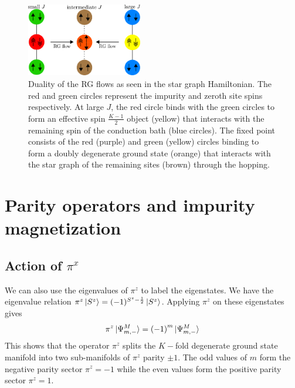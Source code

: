 \documentclass[12pt]{revtex4-2}
\begin{document}
\begin{figure}[htpb]
	\centering
	\includegraphics[width=0.45\textwidth]{./duality.pdf}
	\caption{Duality of the RG flows as seen in the star graph Hamiltonian. The red and green circles represent the impurity and zeroth site spins respectively. At large \(J\), the red circle binds with the green circles to form an effective spin \(\frac{K-1}{2}\) object (yellow) that interacts with the remaining spin of the conduction bath (blue circles). The fixed point consists of the red (purple) and green (yellow) circles binding to form a doubly degenerate ground state (orange) that interacts with the star graph of the remaining sites (brown) through the hopping.}
	\label{duality_fig}
\end{figure}

\section{Parity operators and impurity magnetization}

\subsection{Action of \(\pi^x\)}
We can also use the eigenvalues of \(\pi^z\) to label the eigenstates. We have the eigenvalue relation \(\pi^z \ket{S^z} = (-1)^{S^z - \frac{1}{2}}\ket{S^z}\). Applying \(\pi^z\) on these eigenstates gives
\begin{align}
	\pi^z\ket{\Psi^M_{m,-}} = \left( -1 \right) ^{m}\ket{\Psi^M_{m,-}}
\end{align}
This shows that the operator \(\pi^z\) splits the \(K-\)fold degenerate ground state manifold into two sub-manifolds of \(\pi^z\) parity \(\pm 1\). The odd values of \(m\) form the negative parity sector \(\pi^z = -1\) while the even values form the positive parity sector \(\pi^z = 1\).
\end{document}
